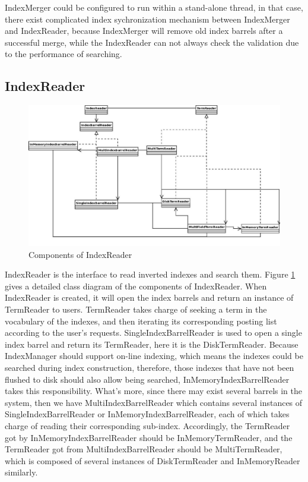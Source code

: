 IndexMerger could be configured to run within a stand-alone thread, in that case, there exist complicated index sychronization mechanism between IndexMerger and IndexReader, because IndexMerger will remove old index barrels after a successful merge, while the IndexReader can not always check the validation due to the performance of searching.


\subsection{IndexReader}


\begin{figure}[h!]
\centerline{\includegraphics[width=\textwidth]{Figures/indexreader.jpg}}
\caption{Components of IndexReader}\label{indexReader}
\end{figure}


\par
IndexReader is the interface to read inverted indexes and search them. Figure \ref{indexReader} gives a detailed class diagram of the components of IndexReader. When IndexReader is created, it will open the index barrels and return an instance of TermReader to users. TermReader takes charge of seeking a term in the vocabulary of the indexes, and then iterating its corresponding posting list according to the user's requests. SingleIndexBarrelReader is used to open a single index barrel and return its TermReader, here it is the DiskTermReader. Because IndexManager should support on-line indexing, which means the indexes could be searched during index construction, therefore, those indexes that have not been flushed to disk should also allow being searched, InMemoryIndexBarrelReader takes this responsibility. What's more, since there may exist several barrels in the system, then we have MultiIndexBarrelReader which contains several instances of SingleIndexBarrelReader or InMemoryIndexBarrelReader, each of which 
takes charge of reading their corresponding sub-index. Accordingly,  the TermReader got by InMemoryIndexBarrelReader should be InMemoryTermReader, and the TermReader got from MultiIndexBarrelReader should be MultiTermReader, which is composed of several instances of DiskTermReader and InMemoryReader similarly.

